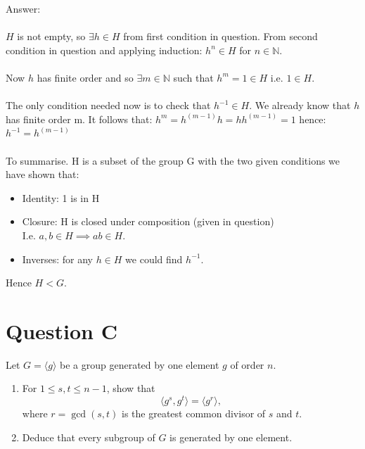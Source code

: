 \documentclass[12pt,a4paper]{article}
\begin{document}
\vspace{1cm}
\noindent
Answer:\\
\\
$H$ is not empty, so $\exists h \in H$ from first condition in question.  From second condition in question and applying induction: $h^n \in H$ for $n \in \mathbb{N}$. \\
\\
Now $h$ has finite order and so $\exists m \in \mathbb{N}$ such that $h^m = 1 \in H$ i.e. $1 \in H$.\\
\\
The only condition needed now is to check that $h^{-1} \in H$.  We already know that $h$ has finite order m.  It follows that:
$h^m = h^{(m-1)} h = h h^{(m-1)} = 1$ hence: $h^{-1} = h^{(m-1)}$\\
\\
To summarise.  H is a subset of the group G with the two given conditions we have shown that:
\begin{itemize}
  \item Identity: 1 is in H
  \item Closure: H is closed under composition (given in question)\\
  I.e. $a,b \in H \implies ab \in H$.
  \item Inverses: for any $h \in H$ we could find $h^{-1}$.
\end{itemize}
Hence $H < G$.

\newpage
\section*{Question C}
Let $G=\langle g\rangle$ be a group generated by one element $g$ of order $n$.
\begin{enumerate}
\item For $1\leq s,t\leq n-1$, show that
\[
\langle g^s,g^t\rangle=\langle g^r\rangle,
\]
where $r=\gcd(s,t)$ is the greatest common divisor of $s$ and $t$.
\item Deduce that every subgroup of $G$ is generated by one element.
\end{enumerate}
\end{document}
